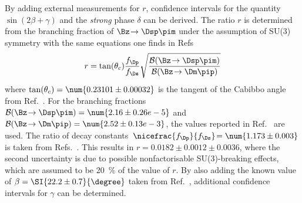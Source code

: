 By adding external measurements for $r$, confidence intervals for the quantity $\sin\!\left(2\beta+\gamma\right)$ and the \emph{strong} phase $\delta$ can be derived.
The ratio $r$ is determined from the branching fraction of $\Bz\!\to\Dsp\pim$ under the assumption of SU(3) symmetry with the same equations one finds in Refs~\cite{Aubert:2008zi, Das:2010be}
\begin{equation}
r=\tan(\theta_c)\frac{f_\Dp}{f_\Ds}\sqrt{\frac{\mathcal{B}\!\left(\Bz\!\to\Dsp\pim\right)}{\mathcal{B}\!\left(\Bz\!\to\Dm\pip\right)}}
\end{equation}
where $\tan(\theta_c)=\num{0.23101\pm0.00032}$ is the tangent of the Cabibbo angle from Ref.~\cite{CKMfitter2015}.
For the branching fractions \mbox{$\mathcal{B}\!\left(\Bz\!\to\Dsp\pim\right)=\num{2.16\pm0.26 e-5}$} and \mbox{$\mathcal{B}\!\left(\Bz\!\to\Dm\pip\right)=\num{2.52\pm0.13 e-3}$}, the values reported in Ref.~\cite{PDG2018} are used.
The ratio of decay constants $\,\nicefrac{f_\Dp}{f_\Ds}\!=\num{1.173\pm0.003}$ is taken from \mbox{Refs.~\cite{Aoki:2016frl, Bazavov:2014wgs, Carrasco:2014poa}}.
This results in $r=0.0182\pm0.0012\pm0.0036$, where the second uncertainty is due to possible nonfactorisable SU(3)-breaking effects, which are assumed to be \SI{20}{\percent} of the value of $r$.
By also adding the known value of $\beta=\SI{22.2\pm0.7}{\degree}$ taken from Ref.~\cite{HFLAV2016}, additional confidence intervals for $\gamma$ can be determined.

